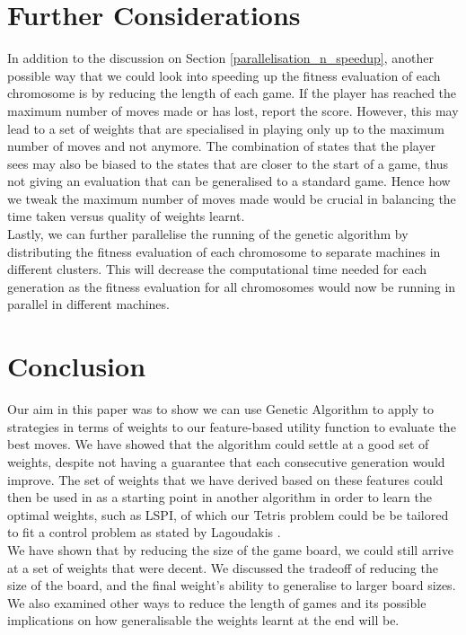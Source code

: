 \documentclass[a4paper,12pt,twocolumn]{article}
\begin{document}
\section{Further Considerations}

In addition to the discussion on Section \ref{parallelisation_n_speedup},
another possible way that we could look into speeding up the fitness evaluation
of each chromosome is by reducing the length of each game. If the player has reached
the maximum number of moves made or has lost, report the score. However, this may
lead to a set of weights that are specialised in playing only up to the maximum
number of moves and not anymore. The combination of states that the player sees may
also be biased to the states that are closer to the start of a game, thus not
giving an evaluation that can be generalised to a standard game. Hence how we
tweak the maximum number of moves made would be crucial in balancing the
time taken versus quality of weights learnt.\\

Lastly, we can further parallelise the running of the genetic algorithm by distributing
the fitness evaluation of each chromosome to separate machines in different
clusters. This will decrease the computational time needed for each generation as the
fitness evaluation for all chromosomes would now be running in parallel in different
machines.

\section{Conclusion}
Our aim in this paper was to show we can use Genetic Algorithm to apply to strategies
in terms of weights to our feature-based utility function to evaluate the best moves.
We have showed that the algorithm could settle at a good set of weights, despite
not having a guarantee that each consecutive generation would improve. The set of weights
that we have derived based on these features could then be used in as a starting point
in another algorithm in order to learn the optimal weights, such as LSPI, of which our
Tetris problem could be be tailored to fit a control problem as stated by Lagoudakis \cite{lagoudakis}.\\

We have shown that by reducing the size of the game board, we could still arrive at
a set of weights that were decent. We discussed the tradeoff of reducing
the size of the board, and the final weight's ability to generalise to larger
board sizes. We also examined other ways to reduce the length of games and its
possible implications on how generalisable the weights learnt at the end will be.\\
\end{document}
